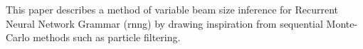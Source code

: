 This paper describes a method of variable beam size inference for Recurrent Neural Network Grammar (rnng) by drawing inspiration from sequential Monte-Carlo methods such as particle filtering.